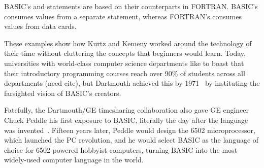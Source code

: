   \begin{tangent}
  BASIC's  and  statements are based on their
  counterparts in FORTRAN.  BASIC's  consumes values from a
  separate  statement, whereas FORTRAN's  consumes
  values from data cards.
  \end{tangent}

These examples show how Kurtz and Kemeny worked around the technology of their
time without cluttering the concepts that beginners would learn.
Today, universities with world-class computer science
departments like to boast that their introductory programming courses
reach over 90\% of
students across all departments (need cite), but
Dartmouth achieved this by 1971~\cite{man_and_computer} by instituting the farsighted 
vision of BASIC's creators.

Fatefully, the Dartmouth/GE timesharing collaboration also
gave GE engineer Chuck Peddle his first exposure to
BASIC, literally the day after the language was
invented~\cite[p.~5]{commodore}.
Fifteen years later, Peddle would design the 6502 microprocessor, which launched
the PC revolution, and he would select BASIC as the language of choice for
6502-powered hobbyist computers, turning BASIC into the most
widely-used computer language in the world.


